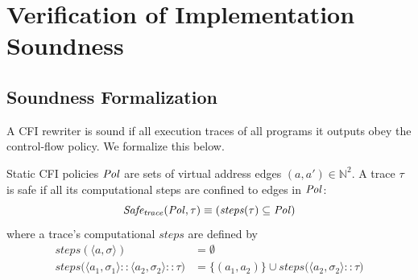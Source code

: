 
\section{Verification of Implementation Soundness}\label{sec:verification}

\subsection{Soundness Formalization}\label{sec:formalization}

A CFI rewriter is sound if all execution traces of all programs it outputs obey the control-flow policy.
We formalize this below.


Static CFI policies $\mathit{Pol}$ are sets of virtual address edges $(a,a')\in\mathbb{N}^2$.
A trace $\tau$ is safe if all its computational steps are confined to edges in $\mathit{Pol}$:
\begin{equation}
\mathit{Safe_{trace}}(\mathit{Pol},\tau) \equiv (\mathit{steps}(\tau)\subseteq\mathit{Pol})
\end{equation}
where a trace's computational $\mathit{steps}$ are defined by
\begin{equation}
\begin{aligned}
\mathit{steps}(\langle a,\sigma\rangle) &= \emptyset \\
\mathit{steps}\big(\langle a_1,\sigma_1\rangle :: \langle a_2,\sigma_2\rangle :: \tau\big) &= \{(a_1,a_2)\}\cup\mathit{steps}\big(\langle a_2,\sigma_2\rangle :: \tau\big)
\end{aligned}
\end{equation}

